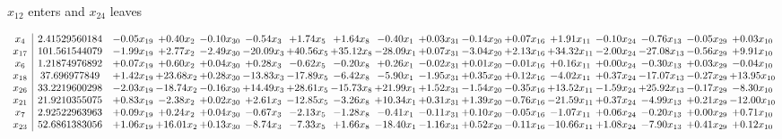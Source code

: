 \documentclass[9pt]{article}
\begin{document}
 $ x_{12} $ enters and $ x_{24} $ leaves 

 \[\begin{array}{c| c c@{\hskip 2pt} c@{\hskip 2pt} c@{\hskip 2pt} c@{\hskip 2pt} c@{\hskip 2pt} c@{\hskip 2pt} c@{\hskip 2pt} c@{\hskip 2pt} c@{\hskip 2pt} c@{\hskip 2pt} c@{\hskip 2pt} c@{\hskip 2pt} c@{\hskip 2pt} c@{\hskip 2pt} c@{\hskip 2pt} }
 x_{4}   &  2.41529560184 & -0.05 x_{19} & +  0.40 x_{2} & -0.10 x_{30} & -0.54 x_{3} & +  1.74 x_{5} & +  1.64 x_{8} & -0.40 x_{1} & +  0.03 x_{31} & -0.14 x_{20} & +  0.07 x_{16} & +  1.91 x_{11} & -0.10 x_{24} & -0.76 x_{13} & -0.05 x_{29} & +  0.03 x_{10}\\
 x_{17}   &  101.561544079 & -1.99 x_{19} & +  2.77 x_{2} & -2.49 x_{30} & -20.09 x_{3} & + 40.56 x_{5} & + 35.12 x_{8} & -28.09 x_{1} & +  0.07 x_{31} & -3.04 x_{20} & +  2.13 x_{16} & + 34.32 x_{11} & -2.00 x_{24} & -27.08 x_{13} & -0.56 x_{29} & +  9.91 x_{10}\\
 x_{6}   &  1.21874976892 & +  0.07 x_{19} & +  0.60 x_{2} & +  0.04 x_{30} & +  0.28 x_{3} & -0.62 x_{5} & -0.20 x_{8} & +  0.26 x_{1} & -0.02 x_{31} & +  0.01 x_{20} & -0.01 x_{16} & +  0.16 x_{11} & +  0.00 x_{24} & -0.30 x_{13} & +  0.03 x_{29} & -0.04 x_{10}\\
 x_{18}   &  37.696977849 & +  1.42 x_{19} & + 23.68 x_{2} & +  0.28 x_{30} & -13.83 x_{3} & -17.89 x_{5} & -6.42 x_{8} & -5.90 x_{1} & -1.95 x_{31} & +  0.35 x_{20} & +  0.12 x_{16} & -4.02 x_{11} & +  0.37 x_{24} & -17.07 x_{13} & -0.27 x_{29} & + 13.95 x_{10}\\
 x_{26}   &  33.2219600298 & -2.03 x_{19} & -18.74 x_{2} & -0.16 x_{30} & + 14.49 x_{3} & + 28.61 x_{5} & -15.73 x_{8} & + 21.99 x_{1} & +  1.52 x_{31} & -1.54 x_{20} & -0.35 x_{16} & + 13.52 x_{11} & -1.59 x_{24} & + 25.92 x_{13} & -0.17 x_{29} & -8.30 x_{10}\\
 x_{21}   &  21.9210355075 & +  0.83 x_{19} & -2.38 x_{2} & +  0.02 x_{30} & +  2.61 x_{3} & -12.85 x_{5} & -3.26 x_{8} & + 10.34 x_{1} & +  0.31 x_{31} & +  1.39 x_{20} & -0.76 x_{16} & -21.59 x_{11} & +  0.37 x_{24} & -4.99 x_{13} & +  0.21 x_{29} & -12.00 x_{10}\\
 x_{7}   &  2.92522963963 & +  0.09 x_{19} & +  0.24 x_{2} & +  0.04 x_{30} & -0.67 x_{3} & -2.13 x_{5} & -1.28 x_{8} & -0.41 x_{1} & -0.11 x_{31} & +  0.10 x_{20} & -0.05 x_{16} & -1.07 x_{11} & +  0.06 x_{24} & -0.20 x_{13} & +  0.00 x_{29} & +  0.71 x_{10}\\
 x_{23}   &  52.6861383056 & +  1.06 x_{19} & + 16.01 x_{2} & +  0.13 x_{30} & -8.74 x_{3} & -7.33 x_{5} & +  1.66 x_{8} & -18.40 x_{1} & -1.16 x_{31} & +  0.52 x_{20} & -0.11 x_{16} & -10.66 x_{11} & +  1.08 x_{24} & -7.90 x_{13} & +  0.41 x_{29} & +  0.12 x_{10}\\

\end{array}\]
\end{document}
